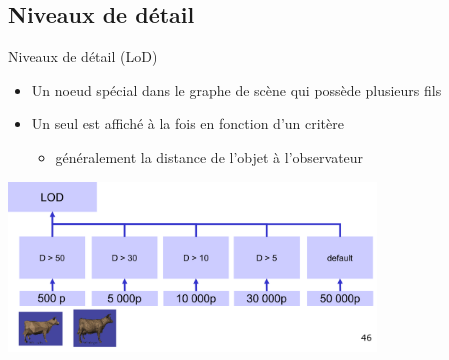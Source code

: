 \subsection{Niveaux de détail}

\begin{frame}[t]{Niveaux de détail (LoD)}
  \begin{itemize}
    \item Un noeud spécial dans le graphe de scène qui possède plusieurs fils
    \item Un seul est affiché à la fois en fonction d'un critère
    \begin{itemize}
      \item généralement la distance de l'objet à l'observateur
    \end{itemize}
  \end{itemize}
  \begin{center}
    \includegraphics[height=4.5cm]{figs/lodth.png}
  \end{center}
\end{frame}
